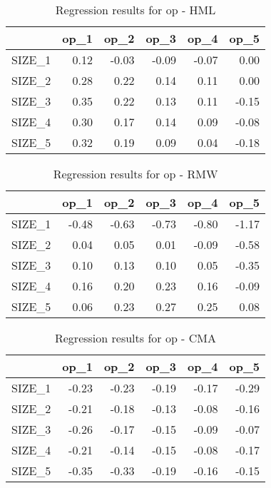 \begin{table}[ht]
\centering
\caption{Regression results for op - HML} 
\begin{tabular}{rrrrrr}
  \hline
 & op\_1 & op\_2 & op\_3 & op\_4 & op\_5 \\ 
  \hline
SIZE\_1 & 0.12 & -0.03 & -0.09 & -0.07 & 0.00 \\ 
  SIZE\_2 & 0.28 & 0.22 & 0.14 & 0.11 & 0.00 \\ 
  SIZE\_3 & 0.35 & 0.22 & 0.13 & 0.11 & -0.15 \\ 
  SIZE\_4 & 0.30 & 0.17 & 0.14 & 0.09 & -0.08 \\ 
  SIZE\_5 & 0.32 & 0.19 & 0.09 & 0.04 & -0.18 \\ 
   \hline
\end{tabular}
\end{table}


\begin{table}[ht]
\centering
\caption{Regression results for op - RMW} 
\begin{tabular}{rrrrrr}
  \hline
 & op\_1 & op\_2 & op\_3 & op\_4 & op\_5 \\ 
  \hline
SIZE\_1 & -0.48 & -0.63 & -0.73 & -0.80 & -1.17 \\ 
  SIZE\_2 & 0.04 & 0.05 & 0.01 & -0.09 & -0.58 \\ 
  SIZE\_3 & 0.10 & 0.13 & 0.10 & 0.05 & -0.35 \\ 
  SIZE\_4 & 0.16 & 0.20 & 0.23 & 0.16 & -0.09 \\ 
  SIZE\_5 & 0.06 & 0.23 & 0.27 & 0.25 & 0.08 \\ 
   \hline
\end{tabular}
\end{table}


\begin{table}[ht]
\centering
\caption{Regression results for op - CMA} 
\begin{tabular}{rrrrrr}
  \hline
 & op\_1 & op\_2 & op\_3 & op\_4 & op\_5 \\ 
  \hline
SIZE\_1 & -0.23 & -0.23 & -0.19 & -0.17 & -0.29 \\ 
  SIZE\_2 & -0.21 & -0.18 & -0.13 & -0.08 & -0.16 \\ 
  SIZE\_3 & -0.26 & -0.17 & -0.15 & -0.09 & -0.07 \\ 
  SIZE\_4 & -0.21 & -0.14 & -0.15 & -0.08 & -0.17 \\ 
  SIZE\_5 & -0.35 & -0.33 & -0.19 & -0.16 & -0.15 \\ 
   \hline
\end{tabular}
\end{table}



